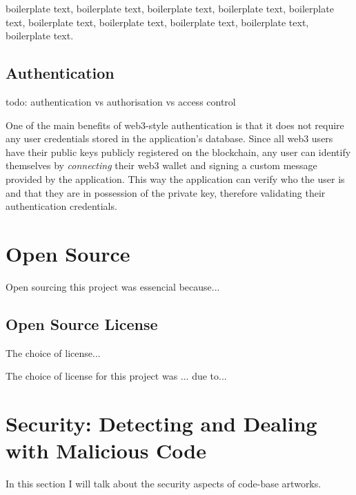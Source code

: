 boilerplate text, boilerplate text, boilerplate text, boilerplate text, boilerplate text, boilerplate text, boilerplate text, boilerplate text, boilerplate text, boilerplate text.

\subsection{Authentication}

todo: authentication vs authorisation vs access control

One of the main benefits of web3-style authentication is that it does not require any user credentials stored in the application's database. Since all web3 users have their public keys publicly registered on the blockchain, any user can identify themselves by \emph{connecting} their web3 wallet and signing a custom message provided by the application. This way the application can verify who the user is and that they are in possession of the private key, therefore validating their authentication credentials.

\section{Open Source}

Open sourcing this project was essencial because...

\subsection{Open Source License}

The choice of license...


The choice of license for this project was ... due to...



\section{Security: Detecting and Dealing with Malicious Code}

In this section I will talk about the security aspects of code-base artworks.